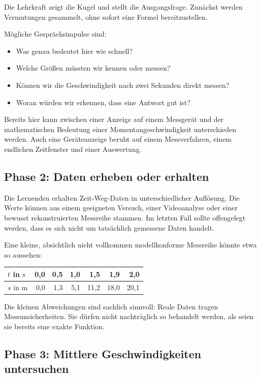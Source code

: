 \documentclass[11pt,a4paper]{article}
\begin{document}
Die Lehrkraft zeigt die Kugel und stellt die Ausgangsfrage. Zunächst werden
Vermutungen gesammelt, ohne sofort eine Formel bereitzustellen.

Mögliche Gesprächsimpulse sind:

\begin{itemize}
  \item Was genau bedeutet hier \glqq wie schnell\grqq?
  \item Welche Größen müssten wir kennen oder messen?
  \item Können wir die Geschwindigkeit nach zwei Sekunden direkt messen?
  \item Woran würden wir erkennen, dass eine Antwort gut ist?
\end{itemize}

Bereits hier kann zwischen einer Anzeige auf einem Messgerät und der
mathematischen Bedeutung einer Momentangeschwindigkeit unterschieden werden.
Auch eine Geräteanzeige beruht auf einem Messverfahren, einem endlichen
Zeitfenster und einer Auswertung.

\subsection{Phase 2: Daten erheben oder erhalten}

Die Lernenden erhalten Zeit-Weg-Daten in unterschiedlicher Auflösung. Die Werte
können aus einem geeigneten Versuch, einer Videoanalyse oder einer bewusst
rekonstruierten Messreihe stammen. Im letzten Fall sollte offengelegt werden,
dass es sich nicht um tatsächlich gemessene Daten handelt.

Eine kleine, absichtlich nicht vollkommen modellkonforme Messreihe könnte etwa
so aussehen:

\begin{center}
\begin{tabular}{@{}lrrrrrr@{}}
\toprule
$t$ in $\mathrm{s}$ & 0{,}0 & 0{,}5 & 1{,}0 & 1{,}5 & 1{,}9 & 2{,}0 \\
\midrule
$s$ in $\mathrm{m}$ & 0{,}0 & 1{,}3 & 5{,}1 & 11{,}2 & 18{,}0 & 20{,}1 \\
\bottomrule
\end{tabular}
\end{center}

Die kleinen Abweichungen sind sachlich sinnvoll: Reale Daten tragen
Messunsicherheiten. Sie dürfen nicht nachträglich so behandelt werden, als seien
sie bereits eine exakte Funktion.

\subsection{Phase 3: Mittlere Geschwindigkeiten untersuchen}
\end{document}
